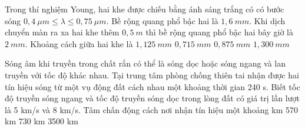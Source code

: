 	\begin{ex}%
		Trong thí nghiệm Young, hai khe được chiếu bằng ánh sáng trắng có có bước sóng $0,4\ \mu m\leq\lambda \leq 0,75\ \mu m$. Bề rộng quang phổ bậc hai là $1,6\ mm$. Khi dịch chuyển màn ra xa hai khe thêm $0,5\ m$ thì bề rộng quang phổ bậc hai bây giờ là $2\ mm$. Khoảng cách giữa hai khe là
		\choice
		{$1,125\ mm$}
		{$0,715\ mm$}
		{\True $0,875\ mm$}
		{$1,300\ mm$}
	\end{ex}
	\begin{ex}%
		Sóng âm khi truyền trong chất rắn có thể là sóng dọc hoặc sóng ngang và lan truyền với tốc độ khác nhau. Tại trung tâm phòng chống thiên tai nhận được hai tín hiệu sóng từ một vụ động đất cách nhau một khoảng thời gian 240 s. Biết tốc độ truyền sóng ngang và tốc độ truyền sóng dọc trong lòng đất có giá trị lần lượt là 5 km/s và 8 km/s. Tâm chấn động cách nơi nhận tín hiệu một khoảng 
		\choice
		{ km}
		{570 km}
		{730 km}
		{3500 km}
		
		
	\end{ex}


